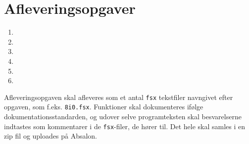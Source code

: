 \documentclass[a4paper,12pt]{article}
\begin{document}
\section*{Afleveringsopgaver}

\begin{enumerate}[label=8i.\arabic*,start=1]
\item 
\item 
\item 
\item 
\item 
\item 
\end{enumerate}


Afleveringsopgaven skal afleveres som et antal \texttt{fsx} tekstfiler navngivet efter opgaven, som f.eks. \lstinline!8i0.fsx!. Funktioner skal dokumenteres ifølge dokumentationsstandarden, og udover selve programteksten skal besvarelserne indtastes som kommentarer i de \texttt{fsx}-filer, de hører til. Det hele skal samles i en zip fil og uploades på Absalon.
\end{document}
